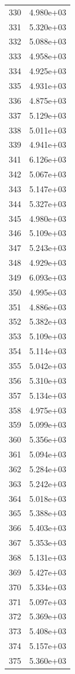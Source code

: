 \documentclass[12pt]{article}
\begin{document}
\begin{longtable}{@{}cc@{}}
330 & 4.980e+03 \\
331 & 5.320e+03 \\
332 & 5.088e+03 \\
333 & 4.958e+03 \\
334 & 4.925e+03 \\
335 & 4.931e+03 \\
336 & 4.875e+03 \\
337 & 5.129e+03 \\
338 & 5.011e+03 \\
339 & 4.941e+03 \\
341 & 6.126e+03 \\
342 & 5.067e+03 \\
343 & 5.147e+03 \\
344 & 5.327e+03 \\
345 & 4.980e+03 \\
346 & 5.109e+03 \\
347 & 5.243e+03 \\
348 & 4.929e+03 \\
349 & 6.093e+03 \\
350 & 4.995e+03 \\
351 & 4.886e+03 \\
352 & 5.382e+03 \\
353 & 5.109e+03 \\
354 & 5.114e+03 \\
355 & 5.042e+03 \\
356 & 5.310e+03 \\
357 & 5.134e+03 \\
358 & 4.975e+03 \\
359 & 5.099e+03 \\
360 & 5.356e+03 \\
361 & 5.094e+03 \\
362 & 5.284e+03 \\
363 & 5.242e+03 \\
364 & 5.018e+03 \\
365 & 5.388e+03 \\
366 & 5.403e+03 \\
367 & 5.353e+03 \\
368 & 5.131e+03 \\
369 & 5.427e+03 \\
370 & 5.334e+03 \\
371 & 5.097e+03 \\
372 & 5.369e+03 \\
373 & 5.408e+03 \\
374 & 5.157e+03 \\
375 & 5.360e+03 \\

\end{longtable}
\end{document}
